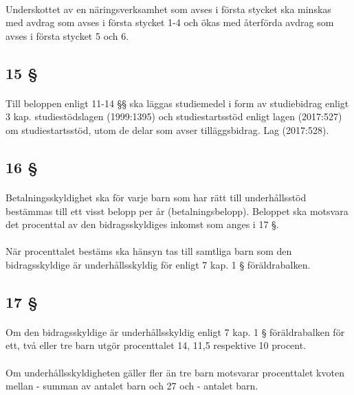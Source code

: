 \documentclass[a4paper,notitlepage,openany,10pt]{book}
\begin{document}
\paragraph*{}
Underskottet av en näringsverksamhet som avses i första stycket ska minskas med avdrag som avses i första stycket 1-4 och ökas med återförda avdrag som avses i första stycket 5 och 6.
\subsection*{15 §}
\paragraph*{}
Till beloppen enligt 11-14 §§ ska läggas studiemedel i form av studiebidrag enligt 3 kap. studiestödslagen (1999:1395) och studiestartsstöd enligt lagen (2017:527) om studiestartsstöd, utom de delar som avser tilläggsbidrag.
Lag (2017:528).
\subsection*{16 §}
\paragraph*{}
Betalningsskyldighet ska för varje barn som har rätt till underhållsstöd bestämmas till ett visst belopp per år (betalningsbelopp). Beloppet ska motsvara det procenttal av den bidragsskyldiges inkomst som anges i 17 §.
\paragraph*{}
När procenttalet bestäms ska hänsyn tas till samtliga barn som den bidragsskyldige är underhållsskyldig för enligt 7 kap. 1 § föräldrabalken.
\subsection*{17 §}
\paragraph*{}
Om den bidragsskyldige är underhållsskyldig enligt 7 kap. 1 § föräldrabalken för ett, två eller tre barn utgör procenttalet 14, 11,5 respektive 10 procent.
\paragraph*{}
Om underhållsskyldigheten gäller fler än tre barn motsvarar procenttalet kvoten mellan
\newline - summan av antalet barn och 27 och
\newline - antalet barn.
\end{document}
